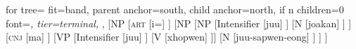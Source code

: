 \documentclass{standalone}
\begin{document}
		\begin{forest}
		for tree={
			fit=band,
			parent anchor=south,
			child anchor=north,
			if n children=0{
				font=\itshape,
				tier=terminal,
			}{},
		}
		[NP
		[\textsc{art}
		[i{=}]
		]
		[NP	
		[NP
		[Intensifier
		[juu] 
		]
		[N
		[joakan] 
		]
		]
		[\textsc{cnj}	
		[ma] 
		]
		[VP
		[Intensifier
		[juu]
		] 
		[V
		[xhopwen]
		]]
		[N
		[juu-sapwen-eong]
		]
		]
		]
	\end{forest}
\end{document}
